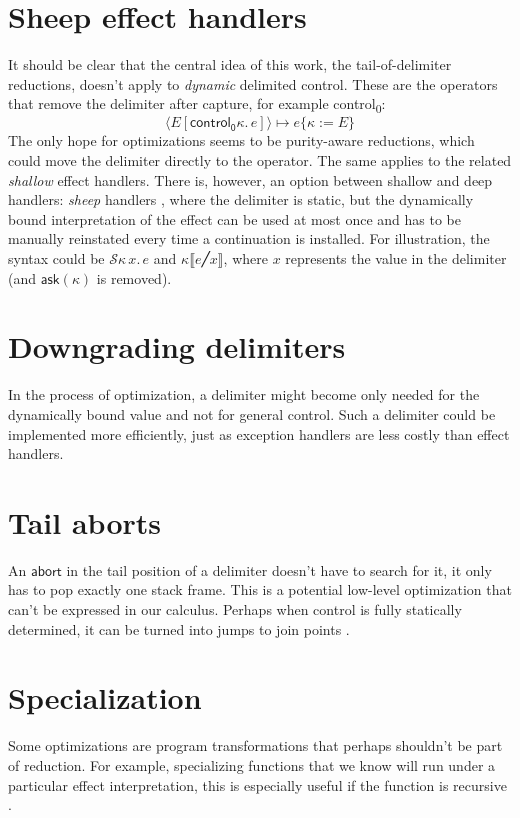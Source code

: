 \documentclass[a4paper, 11pt,titlepage, openright, twoside]{report}
\newcommand{\abort}{\textsf{abort}}
\newcommand{\Ask}{\textsf{ask}}
\newcommand{\subst}[2]{\{#1{:=}#2\}}
\renewcommand{\S}{\mathcal{S}}
\newcommand{\A}{\mathcal{A}}
\newcommand{\+}{\enspace}
\begin{document}

\section{Sheep effect handlers}
It should be clear that the central idea of this work, the tail-of-delimiter reductions,
doesn't apply to \textit{dynamic} delimited control.
These are the operators that remove the delimiter after capture,
for example \textsf{control\textsubscript{0}}:
$$⟨E[\mathsf{control_0} κ.\,e]⟩ ↦ e\subst{κ}{E}$$
The only hope for optimizations seems to be purity-aware reductions,
which could move the delimiter directly to the operator. The same applies to the related \textit{shallow} effect handlers.
There is, however, an option between shallow and deep handlers: \textit{sheep} handlers \cite{sheep},
where the delimiter is static,
but the dynamically bound interpretation of the effect can be used at most once
and has to be manually reinstated every time a continuation is installed.
For illustration,
the syntax could be $\S κ\,x.\,e$ and $κ⟦e╱x⟧$, where $x$ represents the value in the delimiter (and $\Ask(κ)$ is removed).

\section{Downgrading delimiters}
In the process of optimization,
a delimiter might become only needed for the dynamically bound value
and not for general control.
Such a delimiter could be implemented more efficiently,
just as exception handlers are less costly than effect handlers.

\section{Tail aborts}
An $\abort$ in the tail position of a delimiter
doesn't have to search for it,
it only has to pop exactly one stack frame.
This is a potential low-level optimization that can't be expressed in our calculus.
Perhaps when control is fully statically determined,
it can be turned into jumps to join points \cite{cwc}.

\section{Specialization}
Some optimizations are program transformations that perhaps shouldn't be part of reduction.
For example, specializing functions that we know will run under a particular effect interpretation,
this is especially useful if the function is recursive \cite{saleh,karachalias}.
\end{document}
